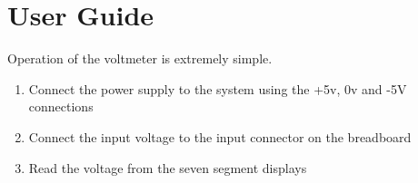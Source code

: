 \chapter{User Guide}
Operation of the voltmeter is extremely simple.\\
\begin{enumerate}
    \item Connect the power supply to the system using the +5v, 0v and -5V connections
    \item Connect the input voltage to the input connector on the breadboard
    \item Read the voltage from the seven segment displays
\end{enumerate}
